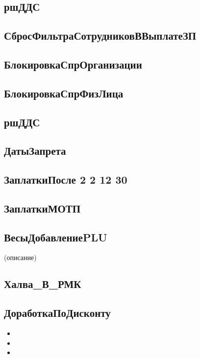\subsection{ршДДС}\label{504}
\subsection{СбросФильтраСотрудниковВВыплатеЗП}\label{505}
\subsection{БлокировкаСпрОрганизации}\label{506}
\subsection{БлокировкаСпрФизЛица}\label{507}
\subsection{ршДДС}\label{508}
\subsection{ДатыЗапрета}\label{509}
\subsection{ЗаплаткиПосле 2 2 12 30}\label{510}
\subsection{ЗаплаткиМОТП}\label{511}
\subsection{ВесыДобавлениеPLU}\label{512} (описание)
\subsection{Халва\_В\_РМК}\label{513}
\subsection{ДоработкаПоДисконту}\label{514}







\begin{itemize}[label={--}]
	\item
		\item
		\item






\end{itemize}

